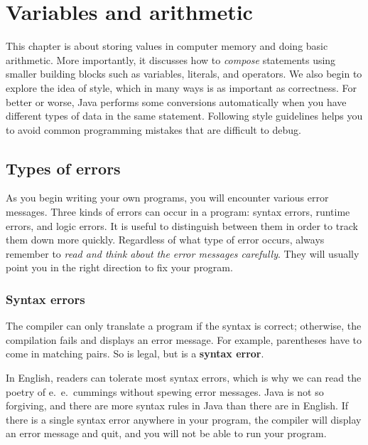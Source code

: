 \chapter{Variables and arithmetic}

This chapter is about storing values in computer memory and doing basic arithmetic.
More importantly, it discusses how to {\em compose} statements using smaller building blocks such as variables, literals, and operators.
We also begin to explore the idea of style, which in many ways is as important as correctness.
For better or worse, Java performs some conversions automatically when you have different types of data in the same statement.
Following style guidelines helps you to avoid common programming mistakes that are difficult to debug.


\section{Types of errors}


As you begin writing your own programs, you will encounter various error messages.
Three kinds of errors can occur in a program: syntax errors, runtime errors, and logic errors.
It is useful to distinguish between them in order to track them down more quickly.
Regardless of what type of error occurs, always remember to {\em read and think about the error messages carefully}.
They will usually point you in the right direction to fix your program.

\subsection{Syntax errors}


The compiler can only translate a program if the syntax is correct; otherwise, the compilation fails and displays an error message.
For example, parentheses have to come in matching pairs.
So  is legal, but  is a {\bf syntax error}.

In English, readers can tolerate most syntax errors, which is why we can read the poetry of e.\ e.\ cummings without spewing error messages.
Java is not so forgiving, and there are more syntax rules in Java than there are in English.
If there is a single syntax error anywhere in your program, the compiler will display an error message and quit, and you will not be able to run your program.

